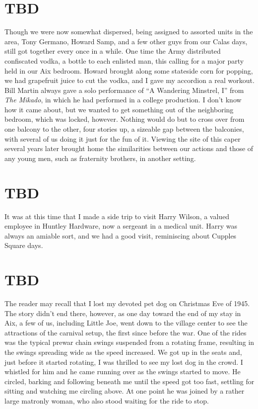 \documentclass[../m3y]{subfiles}
\begin{document}
\section{TBD}
Though we were now somewhat dispersed, being assigned to assorted units in the area, Tony Germano, Howard Samp, and a few other guys from our Calas days, still got together every once in a while. One time the Army distributed confiscated vodka, a bottle to each enlisted man, this calling for a major party held in our Aix bedroom. Howard brought along some stateside corn for popping, we had grapefruit juice to cut the vodka, and I gave my accordion a real workout. Bill Martin always gave a solo performance of ``A Wandering Minstrel, I'' from \emph{The Mikado}, in which he had performed in a college production. I don't know how it came about, but we wanted to get something out of the neighboring bedroom, which was locked, however. Nothing would do but to cross over from one balcony to the other, four stories up, a sizeable gap between the balconies, with several of us doing it just for the fun of it. Viewing the site of this caper several years later brought home the similarities between our actions and those of any young men, such as fraternity brothers, in another setting.

\section{TBD}
It was at this time that I made a side trip to visit Harry Wilson, a valued employee in Huntley Hardware, now a sergeant in a medical unit. Harry was always an amiable sort, and we had a good visit, reminiscing about Cupples Square days.

\section{TBD}
The reader may recall that I lost my devoted pet dog on Christmas Eve of 1945. The story didn't end there, however, as one day toward the end of my stay in Aix, a few of us, including Little Joe, went down to the village center to see the attractions of the carnival setup, the first since before the war. One of the rides was the typical prewar chain swings suspended from a rotating frame, resulting in the swings spreading wide as the speed increased. We got up in the seats and, just before it started rotating, I was thrilled to see my lost dog in the crowd. I whistled for him and he came running over as the swings started to move. He circled, barking and following beneath me until the speed got too fast, settling for sitting and watching me circling above. At one point he was joined by a rather large matronly woman, who also stood waiting for the ride to stop.
\end{document}
